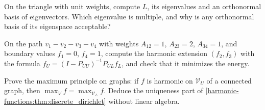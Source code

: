 \begin{notechapter}
\begin{exercise}\label{harmonic-functions:exr:3}
On the triangle with unit weights, compute $L$, its eigenvalues and an orthonormal basis of
eigenvectors. Which eigenvalue is multiple, and why is any orthonormal basis of its eigenspace
acceptable?
\end{exercise}

\begin{exercise}\label{harmonic-functions:exr:4}
On the path $v_1 - v_2 - v_3 - v_4$ with weights $A_{12} = 1$, $A_{23} = 2$, $A_{34} = 1$, and boundary values $f_1 = 0$, $f_4 = 1$, compute the harmonic
extension $(f_2, f_3)$ with the formula $f_U = (I - P_{UU})^{-1}P_{UL}f_L$, and check that it minimizes the energy.
\end{exercise}

\begin{exercise}\label{harmonic-functions:exr:5}
Prove the maximum principle on graphs: if $f$ is harmonic on $\mathcal V_U$ of a connected graph, then
$\max_Vf = \max_{\mathcal V_L}f$. Deduce the uniqueness part of \cref{harmonic-functions:thm:discrete_dirichlet} without linear algebra.
\end{exercise}

\end{notechapter}
